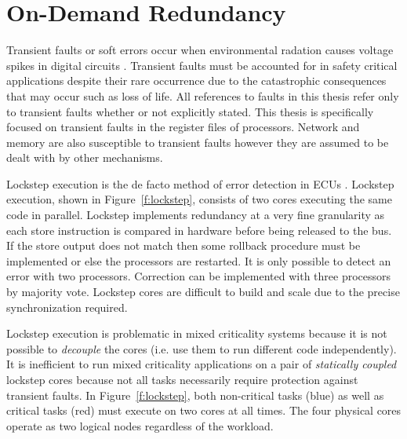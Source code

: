 

\section{On-Demand Redundancy}
\label{s:odr}

	Transient faults or soft errors occur when environmental radation causes voltage spikes in digital circuits \cite{Baumann:05}. 
	Transient faults must be accounted for in safety critical applications despite their rare occurrence due to the catastrophic consequences that may occur such as loss of life.
	All references to faults in this thesis refer only to transient faults whether or not explicitly stated. 
	This thesis is specifically focused on transient faults in the register files of processors. 
	Network \cite{radetzki2013methods} and memory \cite{Baumann:05} are also susceptible to transient faults however they are assumed to be dealt with by other mechanisms.


	Lockstep execution \cite{baleani2003fault} is the de facto method of error detection in ECUs \cite{infineon2014aurix,freescale2014qorivva,renesas2016lockstep}. Lockstep execution, shown in Figure~\ref{f:lockstep}, consists of two cores executing the same code in parallel. 
	Lockstep implements redundancy at a very fine granularity as each store instruction is compared in hardware before being released to the bus. 
	If the store output does not match then some rollback procedure must be implemented or else the processors are restarted. 
	It is only possible to detect an error with two processors. 
	Correction can be implemented with three processors by majority vote. 
	Lockstep cores are difficult to build and scale due to the precise synchronization required.

	Lockstep execution is problematic in mixed criticality systems because it is not possible to \emph{decouple} the cores (i.e. use them to run different code independently). 
	It is inefficient to run mixed criticality applications on a pair of \emph{statically coupled} lockstep cores because not all tasks necessarily require protection against transient faults. 
	In Figure~\ref{f:lockstep}, both non-critical tasks (blue) as well as critical tasks (red) must execute on two cores at all times. 	
	The four physical cores operate as two logical nodes regardless of the workload.

